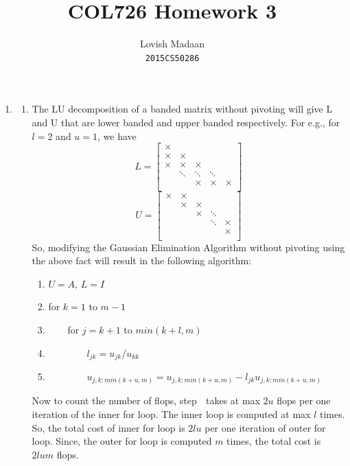 \documentclass{article}
\title{COL726 Homework 3}
\author{Lovish Madaan \\ \texttt{2015CS50286}}
\date{}
\begin{document}
\maketitle

\begin{enumerate}
    \item
    \begin{enumerate}[label=(\alph*)]
        \item The LU decomposition of a banded matrix without pivoting will give L and U that are lower banded and upper banded respectively. For e.g., for $l = 2$ and $u = 1$, we have
        $$L = \begin{bmatrix}
            \times & & & & \\
            \times & \times & & & \\
            \times & \times & \times &  & \\
             & \ddots & \ddots & \ddots & \\
             & & \times & \times & \times \\
        \end{bmatrix}$$
        $$U = \begin{bmatrix}
            \times & \times &  &  & \\
             & \times & \times &  & \\
             &  & \times & \ddots & \\
             &  &  & \ddots & \times \\
             &  &  &  & \times \\
        \end{bmatrix}$$
        So, modifying the Gaussian Elimination Algorithm without pivoting using the above fact will result in the following algorithm:
        \begin{enumerate}
            \item $U = A$, $L = I$
            \item for $k = 1$ to $m - 1$
            \item $\quad\quad$for $j = k + 1$ to $min(k + l, m)$
            \item $\quad\quad\quad\quad l_{jk} = u_{jk} / u_{kk}$
            \item $\quad\quad\quad\quad u_{j, k : min(k + u, m)} = u_{j, k : min(k + u, m)} - l_{jk}u_{j, k : min(k + u, m)}$
        \end{enumerate}
        Now to count the number of flops, step  $\;$ takes at max $2u$ flops per one iteration of the inner for loop. The inner loop is computed at max $l$ times. So, the total cost of inner for loop is $2lu$ per one iteration of outer for loop. Since, the outer for loop is computed $m$ times, the total cost is $2lum$ flops.

\end{enumerate}
\end{enumerate}
\end{document}

